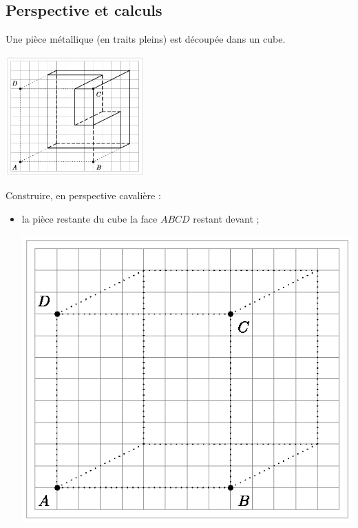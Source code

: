 \subsection{Perspective et calculs}


\begin{exo}



Une pièce métallique (en traits pleins) est découpée dans un cube. 

\begin{center}
		\includegraphics[width=0.4\textwidth]{./Graphiques/piece.eps}\end{center}

Construire, en perspective cavalière : 
\vspace{-1.5em}\begin{multicols}{2}
\begin{itemize}
 \item la pièce restante du cube la face $ABCD$ restant devant ;
 \begin{center}
\includegraphics{./Graphiques/piece2.eps} \end{center}


\end{itemize}
\end{multicols}
\end{exo}
